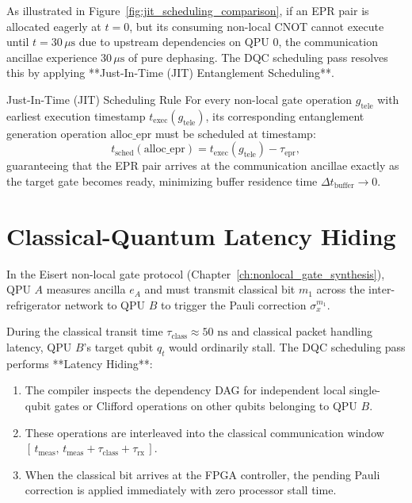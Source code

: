 As illustrated in Figure~\ref{fig:jit_scheduling_comparison}, if an EPR pair is allocated eagerly at $t=0$, but its consuming non-local CNOT cannot execute until $t = 30\,\mu\text{s}$ due to upstream dependencies on QPU 0, the communication ancillae experience $30\,\mu\text{s}$ of pure dephasing. The DQC scheduling pass resolves this by applying **Just-In-Time (JIT) Entanglement Scheduling**.

\begin{definitionbox}{Just-In-Time (JIT) Scheduling Rule}
For every non-local gate operation $g_{\text{tele}}$ with earliest execution timestamp $t_{\text{exec}}(g_{\text{tele}})$, its corresponding entanglement generation operation $\text{alloc\_epr}$ must be scheduled at timestamp:
\begin{equation}
    t_{\text{sched}}(\text{alloc\_epr}) = t_{\text{exec}}(g_{\text{tele}}) - \tau_{\text{epr}},
    \label{eq:jit_rule}
\end{equation}
guaranteeing that the EPR pair arrives at the communication ancillae exactly as the target gate becomes ready, minimizing buffer residence time $\Delta t_{\text{buffer}} \to 0$.
\end{definitionbox}

\section{Classical-Quantum Latency Hiding}
\label{sec:latency_hiding}

In the Eisert non-local gate protocol (Chapter~\ref{ch:nonlocal_gate_synthesis}), QPU $A$ measures ancilla $e_A$ and must transmit classical bit $m_1$ across the inter-refrigerator network to QPU $B$ to trigger the Pauli correction $\sigma_x^{m_1}$. 

During the classical transit time $\tau_{\text{class}} \approx 50\text{ ns}$ and classical packet handling latency, QPU $B$'s target qubit $q_t$ would ordinarily stall. The DQC scheduling pass performs **Latency Hiding**:
\begin{enumerate}
    \item The compiler inspects the dependency DAG for independent local single-qubit gates or Clifford operations on other qubits belonging to QPU $B$.
    \item These operations are interleaved into the classical communication window $[\,t_{\text{meas}}, \, t_{\text{meas}} + \tau_{\text{class}} + \tau_{\text{rx}}\,]$.
    \item When the classical bit arrives at the FPGA controller, the pending Pauli correction is applied immediately with zero processor stall time.
\end{enumerate}

